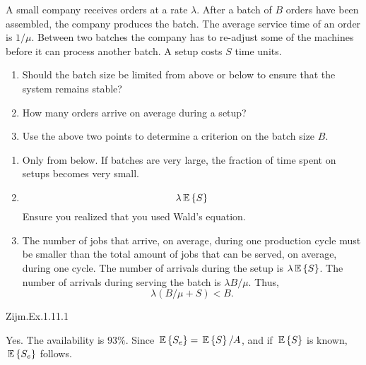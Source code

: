 \begin{question} 

  A small company receives orders at a rate $\lambda$.  After a batch
  of $B$ orders have been assembled, the company produces the batch.
  The average service time of an order is $1/\mu$. Between two batches
  the company has to re-adjust some of the machines before it can
  process another batch. A setup costs  $S$ time units.

\begin{enumerate}
\item Should the batch size be limited from above or below to ensure that the system remains stable? 
\item How many orders arrive on average during a setup?
\item Use the above two points to determine a criterion on the batch size $B$. 
\end{enumerate}

\begin{solution}
\begin{enumerate}
\item Only from below. If batches are very large, the fraction of time spent on setups becomes very small.
\item \begin{equation*}
    \lambda \,\mathbb{E}\left\{S\right\}
  \end{equation*}
Ensure you realized that you used Wald's equation.
\item  The number of jobs that arrive, on average, during one
  production cycle must be smaller than the total amount of jobs that
  can be served, on average, during one cycle.   The number of arrivals during the setup is $\lambda \,\mathbb{E}\left\{S\right\}$. The number of arrivals during serving the batch is $\lambda B/\mu$. Thus, 
  \begin{equation*}
    \lambda ( B/\mu + S) < B.
  \end{equation*}
\end{enumerate}
\end{solution}
\end{question}

\begin{question}
Zijm.Ex.1.11.1
 \begin{solution}
Yes. The availability is $93\%$. Since $\,\mathbb{E}\left\{S_e\right\} = \,\mathbb{E}\left\{S\right\}/A$, and if $\,\mathbb{E}\left\{S\right\} $ is known, $\,\mathbb{E}\left\{S_e\right\}$ follows.
\end{solution}
\end{question}

